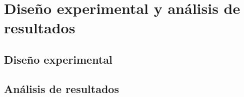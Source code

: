 \chapter{Diseño experimental y análisis de resultados} \label{chap:design_results}

\section{Diseño experimental} \label{sec:experimental_design}

\section{Análisis de resultados} \label{sec:results_analysis}